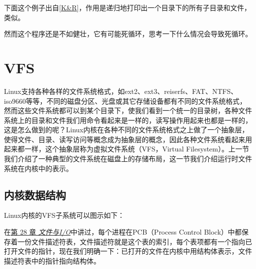 下面这个例子出自\hyperlink{db.bi01.bibli.kr}{[K\&R]}，作用是递归地打印出一个目录下的所有子目录和文件，类似。





然而这个程序还是不如健壮，它有可能死循环，思考一下什么情况会导致死循环。




\section{VFS}
%
Linux支持各种各样的文件系统格式，如ext2、ext3、reiserfs、FAT、NTFS、iso9660等等，不同的磁盘分区、光盘或其它存储设备都有不同的文件系统格式，然而这些文件系统都可以到某个目录下，使我们看到一个统一的目录树，各种文件系统上的目录和文件我们用命令看起来是一样的，读写操作用起来也都是一样的，这是怎么做到的呢？Linux内核在各种不同的文件系统格式之上做了一个抽象层，使得文件、目录、读写访问等概念成为抽象层的概念，因此各种文件系统看起来用起来都一样，这个抽象层称为虚拟文件系统（VFS，Virtual Filesystem）。上一节我们介绍了一种典型的文件系统在磁盘上的存储布局，这一节我们介绍运行时文件系统在内核中的表示。


\subsection{内核数据结构}
%


Linux内核的VFS子系统可以图示如下：




在\hyperlink{db.ch28.id2850161}{第 28 章 \emph{文件与I/\BookSplit{}O}}中讲过，每个进程在PCB（Process Control Block）中都保存着一份文件描述符表，文件描述符就是这个表的索引，每个表项都有一个指向已打开文件的指针，现在我们明确一下：已打开的文件在内核中用结构体表示，文件描述符表中的指针指向结构体。



